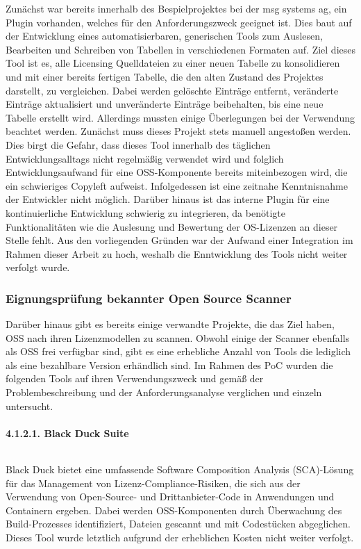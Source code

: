 Zunächst war bereits innerhalb des Bespielprojektes bei der msg systems ag, ein Plugin vorhanden, welches für den Anforderungszweck geeignet ist. Dies baut auf der Entwicklung eines automatisierbaren, generischen Tools zum Auslesen, Bearbeiten und Schreiben von Tabellen in verschiedenen Formaten auf. Ziel dieses Tool ist es, alle Licensing Quelldateien zu einer neuen Tabelle zu konsolidieren und mit einer bereits fertigen Tabelle, die den alten Zustand des Projektes darstellt, zu vergleichen. Dabei werden gelöschte Einträge entfernt, veränderte Einträge aktualisiert und unveränderte Einträge beibehalten, bis eine neue Tabelle erstellt wird. Allerdings mussten einige Überlegungen bei der Verwendung beachtet werden. Zunächst muss dieses Projekt stets manuell angestoßen werden. Dies birgt die Gefahr, dass dieses Tool innerhalb des täglichen Entwicklungsalltags nicht regelmäßig verwendet wird und folglich Entwicklungsaufwand für eine OSS-Komponente bereits miteinbezogen wird, die ein schwieriges Copyleft aufweist. Infolgedessen ist eine zeitnahe Kenntnisnahme der Entwickler nicht möglich. Darüber hinaus ist das interne Plugin für eine kontinuierliche Entwicklung schwierig zu integrieren, da benötigte Funktionalitäten wie die Auslesung und Bewertung der OS-Lizenzen an dieser Stelle fehlt. Aus den vorliegenden Gründen war der Aufwand einer Integration im Rahmen dieser Arbeit zu hoch, weshalb die Enntwicklung des Tools nicht weiter verfolgt wurde.  

\subsubsection{Eignungsprüfung bekannter Open Source Scanner}

Darüber hinaus gibt es bereits einige verwandte Projekte, die das Ziel haben, OSS nach ihren Lizenzmodellen zu scannen. Obwohl einige der Scanner ebenfalls als OSS frei verfügbar sind, gibt es eine erhebliche Anzahl von Tools die lediglich als eine bezahlbare Version erhändlich sind. Im Rahmen des PoC wurden die folgenden Tools auf ihren Verwendungszweck und gemäß der Problembeschreibung und der Anforderungsanalyse verglichen und einzeln untersucht.

\paragraph{4.1.2.1. Black Duck Suite} $~$

Black Duck bietet eine umfassende Software Composition Analysis (SCA)-Lösung für das Management von Lizenz-Compliance-Risiken, die sich aus der Verwendung von Open-Source- und Drittanbieter-Code in Anwendungen und Containern ergeben. \cite{synopsys_black_2021} Dabei werden OSS-Komponenten durch Überwachung des Build-Prozesses identifiziert, Dateien gescannt und mit Codestücken abgeglichen. Dieses Tool wurde letztlich aufgrund der erheblichen Kosten nicht weiter verfolgt.

